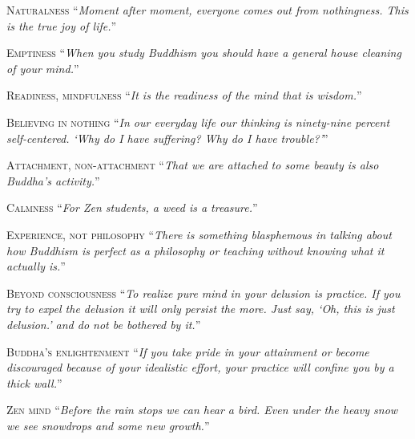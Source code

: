 \documentclass[14pt]{extarticle}
\newcommand{\aphor}[3]{
    \lettrine[lines=2, lraise=0.15]{#1}{#2}
    \enquote{\textit{#3}}
}
\begin{document}
\pagebreak

\aphor{N}{aturalness} {Moment after moment, everyone comes out from nothingness. This is the true joy of life.}

\aphor{E}{mptiness} {When you study Buddhism you should have a general house cleaning of your mind.}

\aphor{R}{eadiness, mindfulness} {It is the readiness of the mind that is wisdom.}

\aphor{B}{elieving in nothing} {In our everyday life our thinking is ninety-nine percent self-centered. \enquote{Why do I have suffering? Why do I have trouble?}}

\aphor{A}{ttachment, non-attachment} {That we are attached to some beauty is also Buddha's activity.}

\aphor{C}{almness} {For Zen students, a weed is a treasure.}

\aphor{E}{xperience, not philosophy} {There is something blasphemous in talking about how Buddhism is perfect as a philosophy or teaching without knowing what it actually is.}

\aphor{B}{eyond consciousness} {To realize pure mind in your delusion is practice. If you try to expel the delusion it will only persist the more. Just say, \enquote{Oh, this is just delusion.} and do not be bothered by it.}

\aphor{B}{uddha's enlightenment} {If you take pride in your attainment or become discouraged because of your idealistic effort, your practice will confine you by a thick wall.}

\aphor{Z}{en mind} {Before the rain stops we can hear a bird. Even under the heavy snow we see snowdrops and some new growth.}
\end{document}
